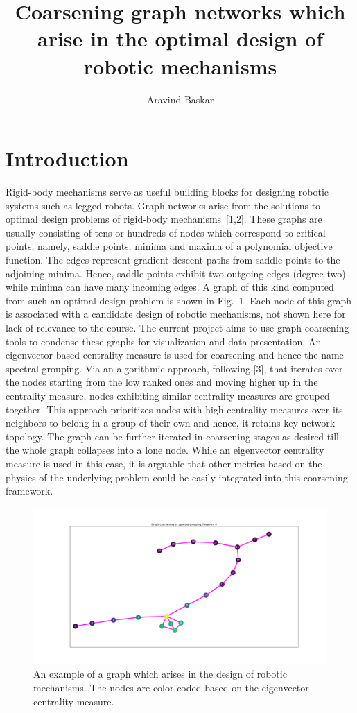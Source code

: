 \documentclass[11pt]{article}
\title{Coarsening graph networks which arise in the optimal design of robotic mechanisms}
\author{Aravind Baskar}
\date{}
\begin{document}
\maketitle

\section{Introduction}
Rigid-body mechanisms serve as useful building blocks for designing robotic systems such as legged robots. Graph networks arise from the solutions to optimal design problems of rigid-body mechanisms~[1,2]. These graphs are usually consisting of tens or hundreds of nodes which correspond to critical points, namely, saddle points, minima and maxima of a polynomial objective function. The edges represent gradient-descent paths from saddle points to the adjoining minima. Hence, saddle points exhibit two outgoing edges (degree two) while minima can have many incoming edges. A graph of this kind computed from such an optimal design problem is shown in Fig.~1. Each node of this graph is associated with a candidate design of robotic mechanisms, not shown here for lack of relevance to the course. The current project aims to use graph coarsening tools to condense these graphs for visualization and data presentation. An eigenvector based centrality measure is used for coarsening and hence the name spectral grouping. Via an algorithmic approach, following [3], that iterates over the nodes starting from the low ranked ones and moving higher up in the centrality measure, nodes exhibiting similar centrality measures are grouped together. This approach prioritizes nodes with high centrality measures over its neighbors to belong in a group of their own and hence, it retains key network topology. The graph can be further iterated in coarsening stages as desired till the whole graph collapses into a lone node. While an eigenvector centrality measure is used in this case, it is arguable that other metrics based on the physics of the underlying problem could be easily integrated into this coarsening framework.

\begin{figure}[htbp]
\centering
\includegraphics[width=1\textwidth]{Figure_0.png}
\caption{An example of a graph which arises in the design of robotic mechanisms. The nodes are color coded based on the eigenvector centrality measure.\label{fig:schematic}}
\end{figure}
\end{document}
